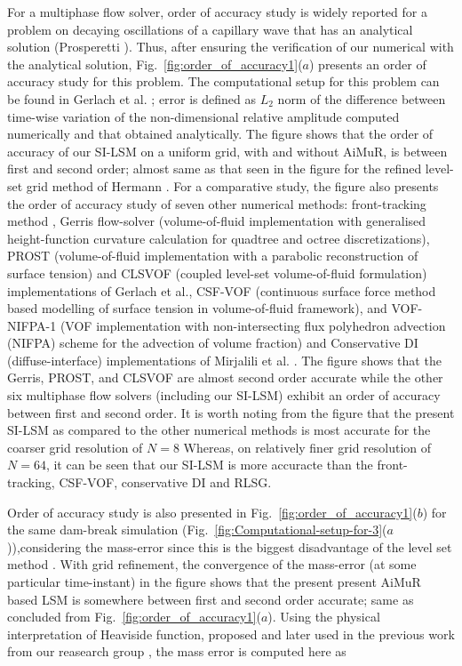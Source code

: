 \documentclass[preprint,12pt]{elsarticle}
\begin{document}
{For a multiphase flow solver, order of accuracy study is widely reported for a problem on decaying oscillations of a capillary wave that has an analytical solution (Prosperetti \cite{prosperetti1981}). Thus, after ensuring the verification of our numerical with the analytical solution, Fig.~\ref{fig:order_of_accuracy1}($a$) presents an order of accuracy study for this problem. The computational setup for this problem can be found in Gerlach et al. \cite{Gerlach2006}; error is defined as $L_{2}$ norm of the difference between time-wise variation of the non-dimensional relative amplitude computed numerically and that obtained analytically. The figure shows that the order of accuracy of our SI-LSM on a uniform grid, with and without AiMuR, is between first and second order; almost same as that seen in the figure for the refined level-set grid method of Hermann \cite{hermann2008}. For a comparative study, the figure also presents the order of accuracy study of seven other numerical methods: front-tracking method \cite{ftm1999}, Gerris flow-solver \cite{popinet2009} (volume-of-fluid implementation with generalised height-function curvature calculation for quadtree and octree discretizations), PROST \cite{Renardy2002} (volume-of-fluid implementation with a parabolic reconstruction of surface tension) and CLSVOF \cite{Sussman2000} (coupled level-set volume-of-fluid formulation) implementations of Gerlach et al.\cite{Gerlach2006}, CSF-VOF \cite{Gueyffier1999}  (continuous surface force method based modelling of surface tension in volume-of-fluid framework), and VOF-NIFPA-1 \cite{Ivey2017} (VOF implementation with non-intersecting flux polyhedron advection (NIFPA) scheme for the advection of volume fraction) and Conservative DI \cite{Mirjalili2020} (diffuse-interface) implementations of Mirjalili et al. \cite{Mirjalili2019} . The figure shows that the Gerris, PROST, and CLSVOF are almost second order accurate while the other six multiphase flow solvers (including our SI-LSM) exhibit an order of accuracy between first and second order. It is worth noting from the figure that the present SI-LSM as compared to the other numerical methods is most accurate for the coarser grid resolution of $N=8$ Whereas, on relatively finer grid resolution of $N=64$, it can be seen that our SI-LSM is more accuracte than the front-tracking, CSF-VOF, conservative DI and RLSG. 




Order of accuracy study is also presented in Fig.~\ref{fig:order_of_accuracy1}($b$) for the same dam-break simulation (Fig.~\ref{fig:Computational-setup-for-3}($a$)),considering the mass-error since this is the biggest disadvantage of the level set method \cite{shrma2015}. With grid refinement, the convergence of the mass-error (at some particular time-instant) in the figure shows that the present present AiMuR based LSM is somewhere between first and second order accurate; same as concluded from Fig.~\ref{fig:order_of_accuracy1}($a$). Using the physical interpretation of Heaviside function, proposed \cite{gada2009} and later used in the previous work from our reasearch group \cite{gada2011, Lakdawala2015}, the mass error is computed here as 

}
\end{document}
